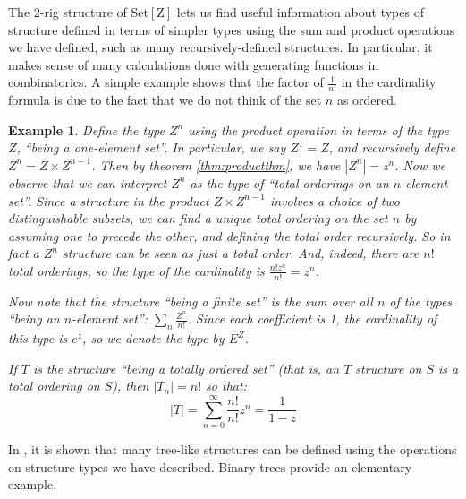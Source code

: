 \documentclass{amsart} \usepackage{amsmath,amssymb,bbm}
\newcommand{\opname}[1]{\operatorname{#1}}
\newcommand{\catname}[1]{\boldsymbol{\opname{{#1}}}}
\newcommand{\SetZ}{\catname{Set [ Z ]}}
\newtheorem{varexample}{Example}
\newenvironment{example}{\begin{varexample}\em}{\em\end{varexample}}
\begin{document}
The 2-rig structure of $\SetZ$ lets us find useful information about
types of structure defined in terms of simpler types using the sum and
product operations we have defined, such as many recursively-defined
structures.  In particular, it makes sense of many calculations done
with generating functions in combinatorics.  A simple example shows
that the factor of $\frac{1}{n!}$ in the cardinality formula is due to
the fact that we do not think of the set $n$ as ordered.

\begin{example} Define the type $Z^n$ using the product operation in
terms of the type $Z$, ``being a one-element set''.  In particular, we
say $Z^1=Z$, and recursively define $Z^n = Z \times Z^{n-1}$.  Then by
theorem \ref{thm:productthm}, we have $|Z^n| = z^n$.  Now we observe
that we can interpret $Z^n$ as the type of ``total orderings on an
$n$-element set''.  Since a structure in the product $Z \times
Z^{n-1}$ involves a choice of two distinguishable subsets, we can find
a unique total ordering on the set $n$ by assuming one to precede the
other, and defining the total order recursively.  So in fact a $Z^n$
structure can be seen as just a total order.  And, indeed, there are
$n!$ total orderings, so the type of the cardinality is $\frac{n! 
z^n}{n!} = z^n$.

Now note that the structure ``being a finite set'' is the sum over all
$n$ of the types ``being an $n$-element set'': $\sum_n
\frac{Z^n}{n!}$.  Since each coefficient is 1, the cardinality of this
type is $e^z$, so we denote the type by $E^Z$.

If $T$ is the structure ``being a totally ordered set'' (that is, an
$T$ structure on $S$ is a total ordering on $S$), then $|T_n| = n!$
so that:
\begin{equation}
  |T| = \sum_{n = 0}^{\infty} \frac{n!}{n!} z^n = \frac{1}{1 - z}
\end{equation}
\end{example}

In {\cite{BLL}}, it is shown that many tree-like structures can be
defined using the operations on structure types we have described.
Binary trees provide an elementary example.
\end{document}
